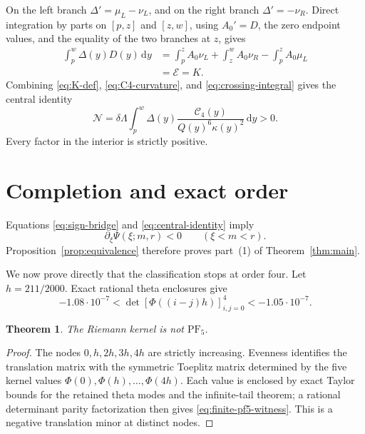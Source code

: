 \documentclass[11pt]{article}
\newtheorem{theorem}{Theorem}[section]
\theoremstyle{remark}
\newcommand{\Cfour}{\mathcal{C}_4}
\newcommand{\dd}{\,\mathrm{d}}
\newcommand{\PF}{\mathrm{PF}}
\numberwithin{equation}{section}
\begin{document}
On the left branch \(\Delta'=\mu_L-\nu_L\), and on the right branch
\(\Delta'=-\nu_R\). Direct integration by parts on \([p,z]\) and \([z,w]\),
using \(A_0'=D\), the zero endpoint values, and the equality of the two
branches at \(z\), gives
\begin{align}
 \int_p^w\Delta(y)D(y)\dd y
 &=\int_p^zA_0\nu_L+\int_z^wA_0\nu_R-\int_p^zA_0\mu_L\nonumber\\
 &=\mathcal E=K.\label{eq:crossing-integral}
\end{align}
Combining \eqref{eq:K-def}, \eqref{eq:C4-curvature}, and
\eqref{eq:crossing-integral} gives the central identity
\begin{equation}\label{eq:central-identity}
 \mathcal N=\delta\Lambda\int_p^w
 \Delta(y)\frac{\Cfour(y)}{Q(y)^6\kappa(y)^2}\dd y>0.
\end{equation}
Every factor in the interior is strictly positive.
\section{Completion and exact order}\label{sec:completion}

Equations \eqref{eq:sign-bridge} and \eqref{eq:central-identity} imply
\[
 \partial_\xi\Psi(\xi;m,r)<0\qquad(\xi<m<r).
\]
Proposition~\ref{prop:equivalence} therefore proves part~(1) of
Theorem~\ref{thm:main}.

We now prove directly that the classification stops at order four. Let
\(h=211/2000\). Exact rational theta enclosures give
\begin{equation}\label{eq:finite-pf5-witness}
 -1.08\mathbin{\cdot}10^{-7}
 <\det[\Phi((i-j)h)]_{i,j=0}^4
 <-1.05\mathbin{\cdot}10^{-7}.
\end{equation}

\begin{theorem}\label{thm:not-pf5}
The Riemann kernel is not \(\PF_5\).
\end{theorem}

\begin{proof}
The nodes \(0,h,2h,3h,4h\) are strictly increasing. Evenness identifies the
translation matrix with the symmetric Toeplitz matrix determined by the five
kernel values \(\Phi(0),\Phi(h),\ldots,\Phi(4h)\). Each value is enclosed by
exact Taylor bounds for the retained theta modes and the infinite-tail theorem;
a rational determinant parity factorization then gives
\eqref{eq:finite-pf5-witness}. This is a negative translation minor at
distinct nodes.
\end{proof}
\end{document}
